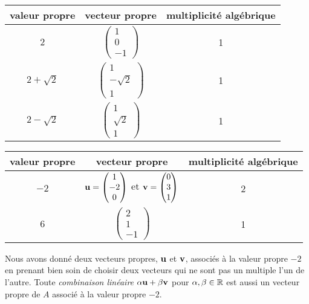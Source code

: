 {
\begin{center}
\begin{tabular}{c|c|c}
valeur propre & vecteur propre & multiplicité algébrique \\
\hline
\rule{0em}{2.5em} $2$ &
$\displaystyle \begin{pmatrix} 1 \\ 0 \\ -1 \end{pmatrix}$ & 1 \\[1.5em]
$2+\sqrt{2}$ &
$\displaystyle \begin{pmatrix} 1 \\ -\sqrt{2} \\ 1 \end{pmatrix}$ & 1 \\[1.5em]
$2-\sqrt{2}$ &
$\displaystyle \begin{pmatrix} 1 \\ \sqrt{2} \\ 1 \end{pmatrix}$ & 1
\end{tabular}
\end{center}

\begin{center}
\begin{tabular}{c|c|c}
valeur propre & vecteur propre & multiplicité algébrique \\
\hline
\rule{0em}{2.5em} $-2$ &
$\displaystyle \mathbf{u} = \begin{pmatrix} 1 \\ -2 \\ 0\end{pmatrix}$ et
$\displaystyle \mathbf{v} = \begin{pmatrix} 0 \\ 3 \\ 1\end{pmatrix}$
& 2 \\[1.5em]
\rule{0em}{2em} $6$ &
$\displaystyle \begin{pmatrix} 2 \\ 1 \\ -1 \end{pmatrix}$ & 1
\end{tabular}
\end{center}
Nous avons donné deux vecteurs propres, $\mathbf{u}$ et $\mathbf{v}$, associés à
la valeur propre $-2$ en prenant bien soin de choisir deux vecteurs qui
ne sont pas un multiple l'un de l'autre.  Toute
{\em combinaison linéaire} $\alpha \mathbf{u} + \beta \mathbf{v}$ pour
$\alpha, \beta \in \mathbb{R}$ est aussi un vecteur propre de $A$ associé à
la valeur propre $-2$.
}


